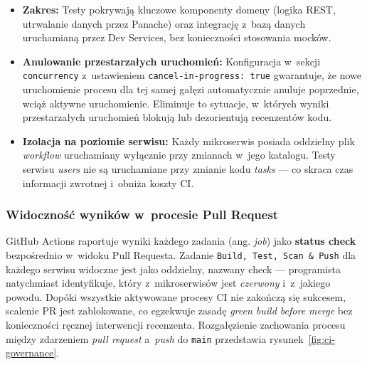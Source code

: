 \begin{itemize}
    \item \textbf{Zakres:} Testy pokrywają kluczowe komponenty domeny (logika REST, utrwalanie danych przez Panache) oraz integrację z~bazą danych uruchamianą przez Dev Services, bez konieczności stosowania mocków.
    \item \textbf{Anulowanie przestarzałych uruchomień:} Konfiguracja w~sekcji \texttt{concurrency} z~ustawieniem \texttt{cancel-in-progress: true} gwarantuje, że nowe uruchomienie procesu dla tej samej gałęzi automatycznie anuluje poprzednie, wciąż aktywne uruchomienie. Eliminuje to sytuacje, w~których wyniki przestarzałych uruchomień blokują lub dezorientują recenzentów kodu.
    \item \textbf{Izolacja na poziomie serwisu:} Każdy mikroserwis posiada oddzielny plik \textit{workflow} uruchamiany wyłącznie przy zmianach w~jego katalogu. Testy serwisu \textit{users} nie są uruchamiane przy zmianie kodu \textit{tasks} --- co skraca czas informacji zwrotnej i~obniża koszty CI.
\end{itemize}

\subsubsection{Widoczność wyników w~procesie Pull Request}
GitHub Actions raportuje wyniki każdego zadania (ang. \textit{job}) jako \textbf{status check} bezpośrednio w~widoku Pull Requesta. Zadanie \texttt{Build, Test, Scan \& Push} dla każdego serwisu widoczne jest jako oddzielny, nazwany check --- programista natychmiast identyfikuje, który z~mikroserwisów jest \textit{czerwony} i~z~jakiego powodu. Dopóki wszystkie aktywowane procesy CI nie zakończą się sukcesem, scalenie PR jest zablokowane, co egzekwuje zasadę \textit{green build before merge} bez konieczności ręcznej interwencji recenzenta. Rozgałęzienie zachowania procesu między zdarzeniem \textit{pull request} a~\textit{push} do \texttt{main} przedstawia rysunek~\ref{fig:ci-governance}.
